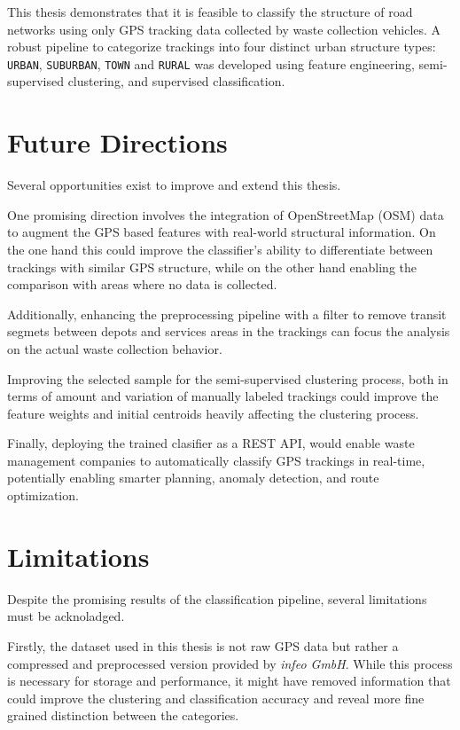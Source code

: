 \documentclass[a4paper,12pt,twoside]{scrreprt}
\begin{document}
This thesis demonstrates that it is feasible to classify the structure of road
networks
using only GPS tracking data collected by waste collection vehicles.
A robust pipeline to categorize trackings into four distinct urban structure
types: \texttt{URBAN}, \texttt{SUBURBAN}, \texttt{TOWN} and \texttt{RURAL} was
developed using feature engineering, semi-supervised clustering, and supervised
classification.

\section{Future Directions}

Several opportunities exist to improve and extend this thesis.

One promising direction involves the integration of OpenStreetMap (OSM) data to
augment the GPS based features with real-world structural information. On the
one hand this could improve the classifier's ability to differentiate between
trackings with similar GPS structure, while on the other hand enabling the
comparison with areas where no data is collected.

Additionally, enhancing the preprocessing pipeline with a filter to remove
transit segmets between depots and services areas in the trackings can focus
the
analysis on the actual waste collection behavior.

Improving the selected sample for the semi-supervised clustering process, both
in terms of amount and variation of manually labeled trackings
could improve the feature weights and initial centroids heavily affecting the
clustering process.

Finally, deploying the trained clasifier as a REST API, would enable
waste management companies to automatically classify GPS trackings in
real-time,
potentially enabling smarter planning, anomaly detection, and route
optimization.

\section{Limitations}

Despite the promising results of the classification pipeline, several
limitations must be acknoladged.

Firstly, the dataset used in this thesis is not raw GPS data but rather a
compressed and preprocessed version provided by \textit{infeo GmbH}.
While this process is necessary for storage and performance, it might have
removed information that could improve the clustering and classification
accuracy and reveal more fine grained distinction between the categories.
\end{document}
